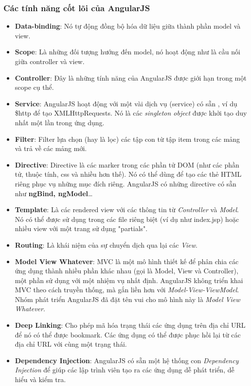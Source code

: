 \documentclass[a4paper]{article}
\begin{document}
\subsubsection{Các tính năng cốt lõi của AngularJS}
\begin{itemize}
	\item \textbf{Data-binding}: Nó tự động đồng bộ hóa dữ liệu giữa thành phần model và view.

	\item \textbf{Scope}: Là những đối tượng hướng đến model, nó hoạt động như là cầu nối giữa controller và view.

	\item \textbf{Controller}: Đây là những tính năng của AngularJS được giới hạn trong một scope cụ thể.

	\item \textbf{Service}: AngularJS hoạt động với một vài dịch vụ (service) có sẵn , ví dụ \$http để tạo XMLHttpRequests. Nó là các \textit{singleton object} được khởi tạo duy nhất một lần trong ứng dụng.

	\item \textbf{Filter}: Filter lựa chọn (hay là lọc) các tập con từ tập item trong các mảng và trả về các mảng mới.

	\item \textbf{Directive}: Directive là các marker trong các phần tử DOM (như các phần tử, thuộc tính, css và nhiều hơn thế). Nó có thể dùng để tạo các thẻ HTML riêng phục vụ những mục đích riêng. AngularJS có những directive có sẵn như \textbf{ngBind, ngModel}…

	\item \textbf{Template}: Là các rendered view với các thông tin từ \textit{Controller} và \textit{Model}. Nó có thể được sử dụng trong các file riêng biệt (ví dụ như index.jsp) hoặc nhiều view với một trang sử dụng "partials".

	\item \textbf{Routing}: Là khái niệm của sự chuyển dịch qua lại các \textit{View}.

	\item \textbf{Model View Whatever}: MVC là một mô hình thiết kế để phân chia các ứng dụng thành nhiều phần khác nhau (gọi là Model, View và Controller), một phần sử dụng với một nhiệm vụ nhất định. AngularJS không triển khai MVC theo cách truyền thống, mà gắn liền hơn với \textit{Model-View-ViewModel}. Nhóm phát triển AngularJS đã đặt tên vui cho mô hình này là \textit{Model View Whatever}.

	\item \textbf{Deep Linking}: Cho phép mã hóa trạng thái các ứng dụng trên địa chỉ URL để nó có thể được bookmark. Các ứng dụng có thể được phục hồi lại từ các địa chỉ URL với cùng một trạng thái.

	\item \textbf{Dependency Injection}: AngularJS có sẵn một hệ thống con \textit{Dependency Injection} để giúp các lập trình viên tạo ra các ứng dụng dễ phát triển, dễ hiểu và kiểm tra.
\end{itemize}
\end{document}
